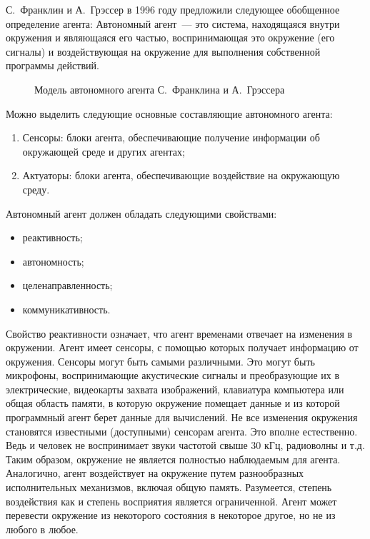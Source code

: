 С.~Франклин и А.~Грэссер в 1996 году предложили следующее обобщенное определение агента: Автономный агент~--- это система, находящаяся внутри окружения и являющаяся его частью, воспринимающая это окружение (его сигналы) и воздействующая на окружение для выполнения собственной программы действий.
\begin{figure}[h]
\caption{Модель автономного агента С.~Франклина и А.~Грэссера}
\label{1:franklin-agent}
\end{figure}

Можно выделить следующие основные составляющие автономного агента:
\begin{enumerate}
\item Сенсоры: блоки агента, обеспечивающие получение информации об окружающей среде и других агентах;
\item Актуаторы: блоки агента, обеспечивающие воздействие на окружающую среду.
\end{enumerate}

Автономный агент должен обладать следующими свойствами:
\begin{itemize}
\item реактивность;
\item автономность;
\item целенаправленность;
\item коммуникативность.
\end{itemize}

Свойство реактивности означает, что агент временами отвечает на изменения в окружении. Агент имеет сенсоры, с помощью которых получает информацию от окружения. Сенсоры могут быть самыми различными. Это могут быть микрофоны, воспринимающие акустические сигналы и преобразующие их в электрические, видеокарты захвата изображений, клавиатура компьютера или общая область памяти, в которую окружение помещает данные и из которой программный агент берет данные для вычислений. Не все изменения окружения становятся известными (доступными) сенсорам агента. Это вполне естественно. Ведь и человек не воспринимает звуки частотой свыше 30 кГц, радиоволны и т.д. Таким образом, окружение не является полностью наблюдаемым для агента. Аналогично, агент воздействует на окружение путем разнообразных исполнительных механизмов, включая общую память. Разумеется, степень воздействия как и степень восприятия является ограниченной. Агент может перевести окружение из некоторого состояния в некоторое другое, но не из любого в любое.

